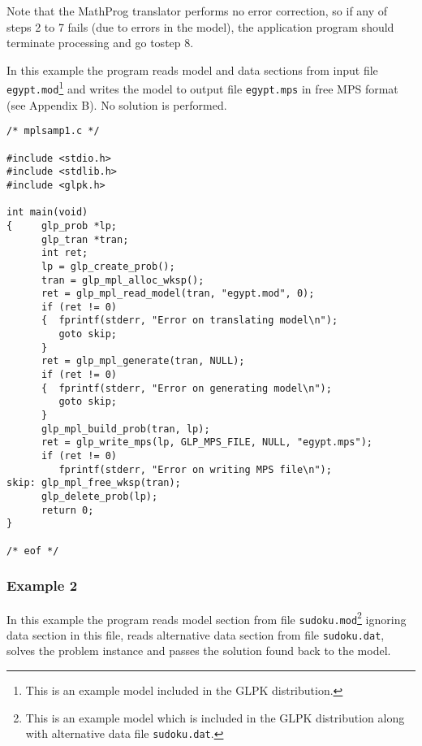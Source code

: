 Note that the MathProg translator performs no error correction, so if
any of steps 2 to 7 fails (due to errors in the model), the application
program should terminate processing and go to\linebreak step 8.

\newpage


In this example the program reads model and data sections from input
file \verb|egypt.mod|\footnote{This is an example model included in
the GLPK distribution.} and writes the model to output file
\verb|egypt.mps| in free MPS format (see Appendix B). No solution is
performed.

\bigskip

\begin{small}
\begin{verbatim}
/* mplsamp1.c */

#include <stdio.h>
#include <stdlib.h>
#include <glpk.h>

int main(void)
{     glp_prob *lp;
      glp_tran *tran;
      int ret;
      lp = glp_create_prob();
      tran = glp_mpl_alloc_wksp();
      ret = glp_mpl_read_model(tran, "egypt.mod", 0);
      if (ret != 0)
      {  fprintf(stderr, "Error on translating model\n");
         goto skip;
      }
      ret = glp_mpl_generate(tran, NULL);
      if (ret != 0)
      {  fprintf(stderr, "Error on generating model\n");
         goto skip;
      }
      glp_mpl_build_prob(tran, lp);
      ret = glp_write_mps(lp, GLP_MPS_FILE, NULL, "egypt.mps");
      if (ret != 0)
         fprintf(stderr, "Error on writing MPS file\n");
skip: glp_mpl_free_wksp(tran);
      glp_delete_prob(lp);
      return 0;
}

/* eof */
\end{verbatim}
\end{small}

\newpage

\subsubsection*{Example 2}

In this example the program reads model section from file
\verb|sudoku.mod|\footnote{This is an example model which is included
in the GLPK distribution along with alternative data file
{\tt sudoku.dat}.} ignoring data section in this file, reads alternative
data section from file \verb|sudoku.dat|, solves the problem instance
and passes the solution found back to the model.

